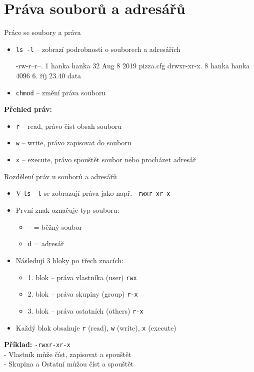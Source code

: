 \documentclass{beamer}
\begin{document}
\section{Práva souborů a adresářů}
\begin{frame}[fragile]{Práce se soubory a práva}
	\begin{itemize}
		\item \texttt{ls -l} – zobrazí podrobnosti o souborech a adresářích
		\begin{semiverbatim}
			-rw-r--r--. 1 hanka hanka    32 Aug  8  2019 pizza.cfg
			drwxr-xr-x. 8 hanka hanka 4096  6. říj 23.40 data
		\end{semiverbatim}
		\item \texttt{chmod} – změní práva souboru
	\end{itemize}
	
	\textbf{Přehled práv:}
	\begin{itemize}
		\item \texttt{r} – read, právo číst obsah souboru
		\item \texttt{w} – write, právo zapisovat do souboru
		\item \texttt{x} – execute, právo spouštět soubor nebo procházet adresář
	\end{itemize}
\end{frame}

\begin{frame}{Rozdělení práv u souborů a adresářů}
	\begin{itemize}
		\item V \texttt{ls -l} se zobrazují práva jako např. \texttt{-rwxr-xr-x}
		\item První znak označuje typ souboru:
		\begin{itemize}
			\item \texttt{-} = běžný soubor
			\item \texttt{d} = adresář
		\end{itemize}
		\item Následují 3 bloky po třech znacích:
		\begin{itemize}
			\item 1. blok – práva vlastníka (user)  \texttt{rwx}
			\item 2. blok – práva skupiny (group)  \texttt{r-x}
			\item 3. blok – práva ostatních (others)  \texttt{r-x}
		\end{itemize}
		\item Každý blok obsahuje \texttt{r} (read), \texttt{w} (write), \texttt{x} (execute)
	\end{itemize}
	
	\textbf{Příklad:} \texttt{-rwxr-xr-x}  \\
	- Vlastník může číst, zapisovat a spouštět   \\
	- Skupina a Ostatní můžou číst a spouštět  
\end{frame}
\end{document}
